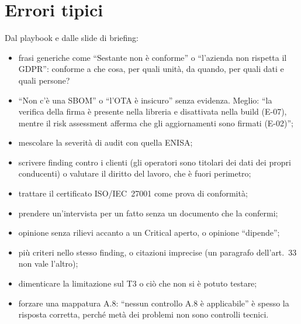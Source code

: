 \section{Errori tipici}

Dal playbook e dalle slide di briefing:
\begin{itemize}
  \item frasi generiche come ``Sestante non è conforme'' o ``l'azienda non rispetta il GDPR'': conforme
    a che cosa, per quali unità, da quando, per quali dati e quali persone?
  \item ``Non c'è una SBOM'' o ``l'OTA è insicuro'' senza evidenza. Meglio: ``la verifica della firma
    è presente nella libreria e disattivata nella build (E-07), mentre il risk assessment afferma che
    gli aggiornamenti sono firmati (E-02)'';
  \item mescolare la severità di audit con quella ENISA;
  \item scrivere finding contro i clienti (gli operatori sono titolari dei dati dei propri
    conducenti) o valutare il diritto del lavoro, che è fuori perimetro;
  \item trattare il certificato ISO/IEC~27001 come prova di conformità;
  \item prendere un'intervista per un fatto senza un documento che la confermi;
  \item opinione senza rilievi accanto a un Critical aperto, o opinione ``dipende'';
  \item più criteri nello stesso finding, o citazioni imprecise (un paragrafo dell'art.~33 non vale
    l'altro);
  \item dimenticare la limitazione sul T3 o ciò che non si è potuto testare;
  \item forzare una mappatura A.8: ``nessun controllo A.8 è applicabile'' è spesso la risposta
    corretta, perché metà dei problemi non sono controlli tecnici.
\end{itemize}

